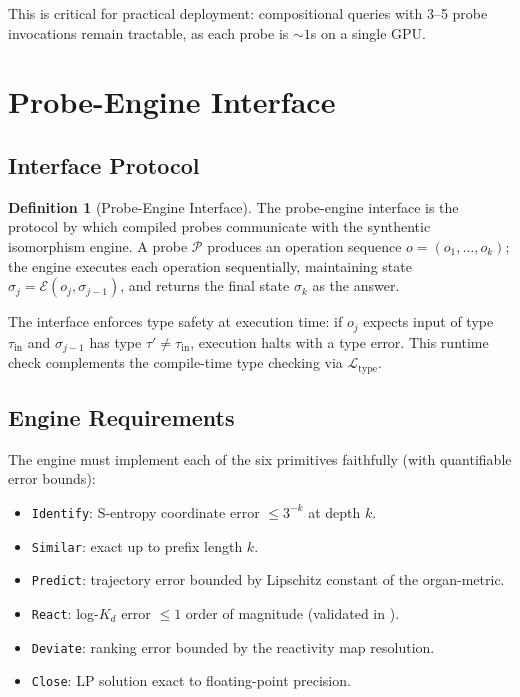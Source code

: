 \documentclass[11pt,twocolumn,a4paper]{article}
\theoremstyle{definition}
\newtheorem{definition}[theorem]{Definition}
\theoremstyle{remark}
\newcommand{\loss}{\mathcal{L}}
\newcommand{\probe}{\mathcal{P}}
\newcommand{\engine}{\mathcal{E}}
\begin{document}
This is critical for practical deployment: compositional queries with 3--5 probe invocations remain tractable, as each probe is $\sim\!1$s on a single GPU.

\section{Probe-Engine Interface}
\label{sec:probe_engine_interface}

\subsection{Interface Protocol}

\begin{definition}[Probe-Engine Interface]
\label{def:interface}
The probe-engine interface is the protocol by which compiled probes communicate with the synthentic isomorphism engine. A probe $\probe$ produces an operation sequence $o = (o_1, \ldots, o_k)$; the engine executes each operation sequentially, maintaining state $\sigma_j = \engine(o_j, \sigma_{j-1})$, and returns the final state $\sigma_k$ as the answer.
\end{definition}

The interface enforces type safety at execution time: if $o_j$ expects input of type $\tau_{\mathrm{in}}$ and $\sigma_{j-1}$ has type $\tau' \neq \tau_{\mathrm{in}}$, execution halts with a type error. This runtime check complements the compile-time type checking via $\loss_{\mathrm{type}}$.

\subsection{Engine Requirements}

The engine must implement each of the six primitives faithfully (with quantifiable error bounds):
\begin{itemize}[nosep,leftmargin=*]
\item \texttt{Identify}: S-entropy coordinate error $\leq 3^{-k}$ at depth $k$.
\item \texttt{Similar}: exact up to prefix length $k$.
\item \texttt{Predict}: trajectory error bounded by Lipschitz constant of the organ-metric.
\item \texttt{React}: log-$K_d$ error $\leq 1$ order of magnitude (validated in \citep{sachikonye2025e}).
\item \texttt{Deviate}: ranking error bounded by the reactivity map resolution.
\item \texttt{Close}: LP solution exact to floating-point precision.
\end{itemize}
\end{document}
